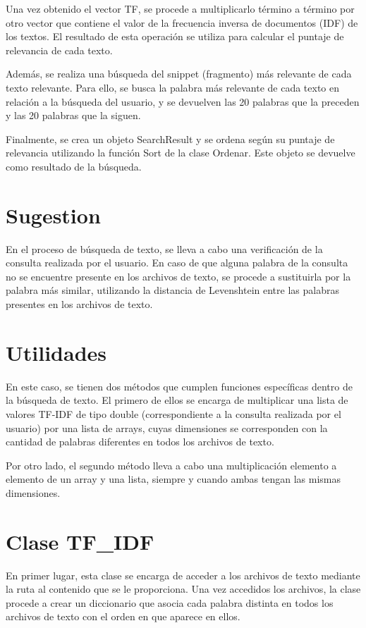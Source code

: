 \documentclass{article}
\begin{document}
Una vez obtenido el vector TF, se procede a multiplicarlo término a término por otro vector que contiene el valor de la frecuencia inversa de documentos (IDF) de los textos. El resultado de esta operación se utiliza para calcular el puntaje de relevancia de cada texto.

Además, se realiza una búsqueda del snippet (fragmento) más relevante de cada texto relevante. Para ello, se busca la palabra más relevante de cada texto en relación a la búsqueda del usuario, y se devuelven las 20 palabras que la preceden y las 20 palabras que la siguen.

Finalmente, se crea un objeto SearchResult y se ordena según su puntaje de relevancia utilizando la función Sort de la clase Ordenar. Este objeto se devuelve como resultado de la búsqueda.
\vspace{10pt}


\section*{Sugestion}
En el proceso de búsqueda de texto, se lleva a cabo una verificación de la consulta realizada por el usuario. En caso de que alguna palabra de la consulta no se encuentre presente en los archivos de texto, se procede a sustituirla por la palabra más similar, utilizando la distancia de Levenshtein entre las palabras presentes en los archivos de texto.
\section*{Utilidades}
En este caso, se tienen dos métodos que cumplen funciones específicas dentro de la búsqueda de texto. El primero de ellos se encarga de multiplicar una lista de valores TF-IDF de tipo double (correspondiente a la consulta realizada por el usuario) por una lista de arrays, cuyas dimensiones se corresponden con la cantidad de palabras diferentes en todos los archivos de texto.

Por otro lado, el segundo método lleva a cabo una multiplicación elemento a elemento de un array y una lista, siempre y cuando ambas tengan las mismas dimensiones.
\section*{Clase TF\_{}IDF}
En primer lugar, esta clase se encarga de acceder a los archivos de texto mediante la ruta al contenido que se le proporciona. Una vez accedidos los archivos, la clase procede a crear un diccionario que asocia cada palabra distinta en todos los archivos de texto con el orden en que aparece en ellos.
\end{document}
